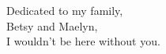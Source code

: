 \begin{dedication}
\null\vfil
{\large
\begin{center}
Dedicated to my family,\\\vspace{12pt}
Betsy and Maelyn,\\\vspace{12pt}
I wouldn't be here without you.\\\vspace{12pt}
\end{center}}
\vfil\null
\end{dedication}
